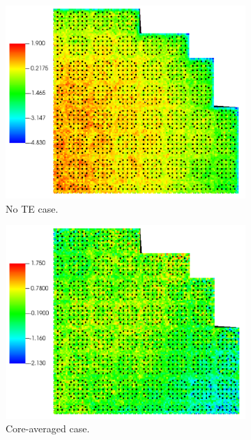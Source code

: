 \begin{figure}
    \centering
    \begin{subfigure}[b]{0.5\textwidth}
        \centering
        \includegraphics[width=\textwidth]{figs/pin_error_no_exp.pdf}
        \caption{No TE case.}
    \end{subfigure}
    \begin{subfigure}[b]{0.5\textwidth}
        \centering
        \includegraphics[width=\textwidth]{figs/pin_error_nominal.pdf}
        \caption{Core-averaged case.}
    \end{subfigure}
    \begin{subfigure}[b]{0.5\textwidth}

\end{subfigure}
\end{figure}
